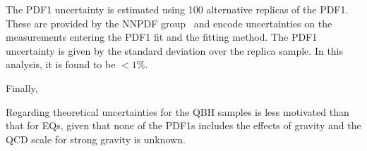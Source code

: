 The \ac{PDF1} uncertainty is estimated using 100 alternative replicas of the \ac{PDF1}. These are provided by the NNPDF group~\cite{NNPDF2} and encode uncertainties on the measurements entering the \ac{PDF1} fit and the fitting method. The \ac{PDF1} uncertainty is given by the standard deviation over the replica sample. In this analysis, it is found to be \(<1\%\).

Finally, 

Regarding theoretical uncertainties for the \ac{QBH} samples is less motivated than that for \acp{EQ}, given that none of the \acp{PDF1} includes the effects of gravity and the \ac{QCD} scale for strong gravity is unknown.



